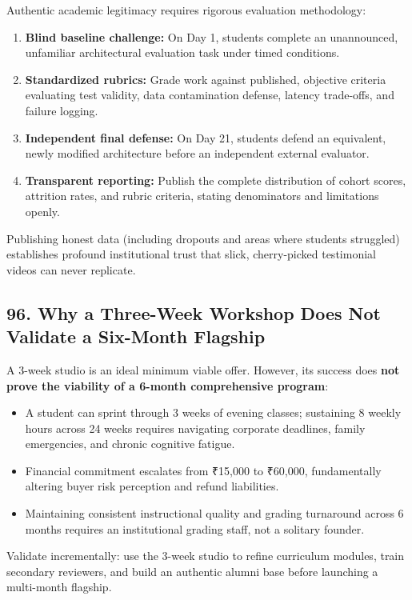 Authentic academic legitimacy requires rigorous evaluation methodology:
\begin{enumerate}
    \item \textbf{Blind baseline challenge:} On Day 1, students complete an unannounced, unfamiliar architectural evaluation task under timed conditions.
    \item \textbf{Standardized rubrics:} Grade work against published, objective criteria evaluating test validity, data contamination defense, latency trade-offs, and failure logging.
    \item \textbf{Independent final defense:} On Day 21, students defend an equivalent, newly modified architecture before an independent external evaluator.
    \item \textbf{Transparent reporting:} Publish the complete distribution of cohort scores, attrition rates, and rubric criteria, stating denominators and limitations openly.
\end{enumerate}

Publishing honest data (including dropouts and areas where students struggled) establishes profound institutional trust that slick, cherry-picked testimonial videos can never replicate.

\subsection*{96. Why a Three-Week Workshop Does Not Validate a Six-Month Flagship}

A 3-week studio is an ideal minimum viable offer. However, its success does \textbf{not prove the viability of a 6-month comprehensive program}:
\begin{itemize}
    \item A student can sprint through 3 weeks of evening classes; sustaining 8 weekly hours across 24 weeks requires navigating corporate deadlines, family emergencies, and chronic cognitive fatigue.
    \item Financial commitment escalates from ₹15,000 to ₹60,000, fundamentally altering buyer risk perception and refund liabilities.
    \item Maintaining consistent instructional quality and grading turnaround across 6 months requires an institutional grading staff, not a solitary founder.
\end{itemize}

Validate incrementally: use the 3-week studio to refine curriculum modules, train secondary reviewers, and build an authentic alumni base before launching a multi-month flagship.
